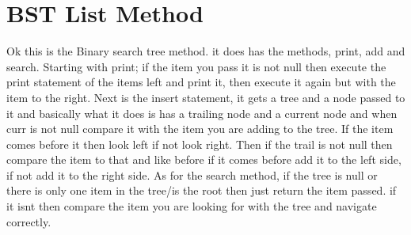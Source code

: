 \documentclass[letterpaper, 10pt]{article}
\begin{document}
\section{BST List Method}
Ok this is the Binary search tree method. it does has the methods, print, add and search. Starting with print; if the item you pass it is not null then execute the print statement of the items left and print it, then execute it again but with the item to the right. Next is the insert statement, it gets a tree and a node passed to it and basically what it does is has a trailing node and a current node and when curr is not null compare it with the item you are adding to the tree. If the item comes before it then look left if not look right. Then if the trail is not null then compare the item to that and like before if it comes before add it to the left side, if not add it to the right side. As for the search method, if the tree is null or there is only one item in the tree/is the root then just return the item passed. if it isnt then compare the item you are looking for with the tree and navigate correctly.
\end{document}
